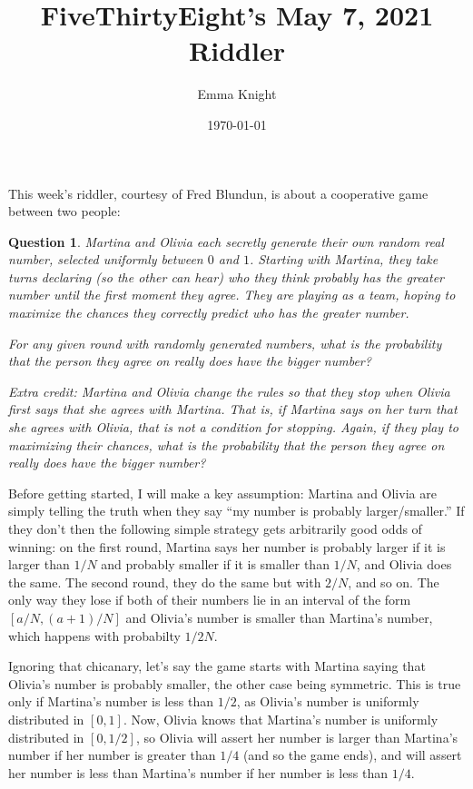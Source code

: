 \documentclass[11pt]{article}
\title{FiveThirtyEight's May 7, 2021 Riddler}
\author{Emma Knight}
\date{\today}
\newtheorem{question}[theorem]{Question}
\theoremstyle{definition}
\begin{document}
\maketitle
This week's riddler, courtesy of Fred Blundun, is about a cooperative game between two people:
\begin{question}
Martina and Olivia each secretly generate their own random real number, selected uniformly between $0$ and $1$. Starting with Martina, they take turns declaring (so the other can hear) who they think probably has the greater number until the first moment they agree.  They are playing as a team, hoping to maximize the chances they correctly predict who has the greater number.

For any given round with randomly generated numbers, what is the probability that the person they agree on really does have the bigger number?

\emph{Extra credit}: Martina and Olivia change the rules so that they stop when Olivia first says that she agrees with Martina. That is, if Martina says on her turn that she agrees with Olivia, that is not a condition for stopping. Again, if they play to maximizing their chances, what is the probability that the person they agree on really does have the bigger number?
\end{question}
Before getting started, I will make a key assumption: Martina and Olivia are simply telling the truth when they say ``my number is probably larger/smaller.''  If they don't then the following simple strategy gets arbitrarily good odds of winning: on the first round, Martina says her number is probably larger if it is larger than $1/N$ and probably smaller if it is smaller than $1/N$, and Olivia does the same.  The second round, they do the same but with $2/N$, and so on.  The only way they lose if both of their numbers lie in an interval of the form $[a/N, (a+1)/N]$ and Olivia's number is smaller than Martina's number, which happens with probabilty $1/2N$.

Ignoring that chicanary, let's say the game starts with Martina saying that Olivia's number is probably smaller, the other case being symmetric.  This is true only if Martina's number is less than $1/2$, as Olivia's number is uniformly distributed in $[0, 1]$.  Now, Olivia knows that Martina's number is uniformly distributed in $[0, 1/2]$, so Olivia will assert her number is larger than Martina's number if her number is greater than $1/4$ (and so the game ends), and will assert her number is less than Martina's number if her number is less than $1/4$.
\end{document}

